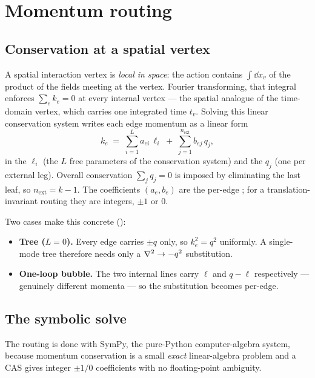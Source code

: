 \section{Momentum routing}\label{sec:routing}

\subsection{Conservation at a spatial vertex}

A spatial interaction vertex is \emph{local in space}: the action contains
$\int\dd x_v$ of the product of the fields meeting at the vertex. Fourier
transforming, that integral enforces 
$\sum_e k_e = 0$ at every internal vertex --- the spatial analogue of the
time-domain vertex, which carries one integrated time $t_v$. Solving this linear
conservation system writes each edge momentum as a linear form
\begin{equation}
  k_e \;=\; \sum_{i=1}^{L} a_{ei}\,\ell_i \;+\; \sum_{j=1}^{n_{\text{ext}}} b_{ej}\,q_j,
  \label{eq:route}
\end{equation}
in the  $\ell_i$ (the $L$ free parameters of the conservation
system) and the  $q_j$ (one per external leg). Overall
conservation $\sum_j q_j = 0$ is imposed by eliminating the last leaf, so
$n_{\text{ext}} = k-1$. The coefficients $(a_e,b_e)$ are the per-edge
; for a translation-invariant routing they are
integers, $\pm1$ or $0$.

Two cases make this concrete ():

\begin{itemize}
  \item \textbf{Tree ($L=0$).} Every edge carries $\pm q$ only, so $k_e^2 = q^2$
        uniformly. A single-mode tree therefore needs only a
        $\nabla^2 \to -q^2$ substitution.
  \item \textbf{One-loop bubble.} The two internal lines carry $\ell$ and
        $q-\ell$ respectively --- genuinely different momenta --- so the
        substitution becomes per-edge.
\end{itemize}

\subsection{The symbolic solve}

The routing is done with SymPy, the pure-Python computer-algebra system, because
momentum conservation is a small \emph{exact} linear-algebra problem and a CAS
gives integer $\pm1/0$ coefficients with no floating-point ambiguity.

